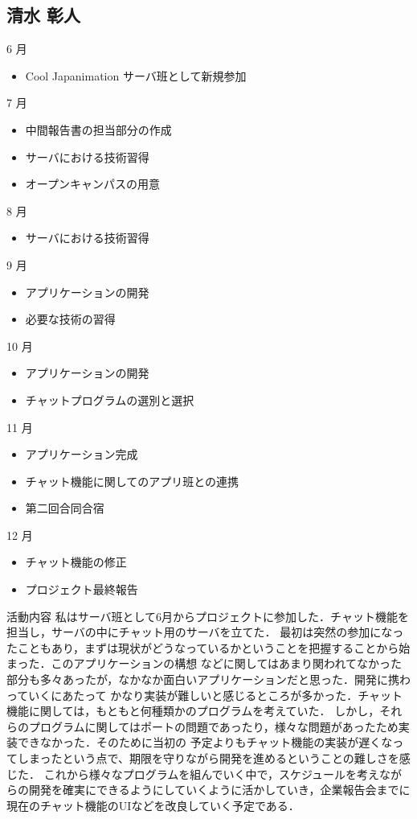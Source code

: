 \subsection{清水 彰人}
6 月
\begin{itemize}
\item Cool Japanimation サーバ班として新規参加
\end{itemize}
7 月
\begin{itemize}
\item 中間報告書の担当部分の作成
\item サーバにおける技術習得
\item オープンキャンパスの用意
\end{itemize}
8 月
\begin{itemize}
\item サーバにおける技術習得
\end{itemize}
9 月
\begin{itemize}
\item アプリケーションの開発
\item 必要な技術の習得
\end{itemize}
10 月
\begin{itemize}
\item アプリケーションの開発
\item チャットプログラムの選別と選択
\end{itemize}
11 月
\begin{itemize}
\item アプリケーション完成
\item チャット機能に関してのアプリ班との連携
\item 第二回合同合宿
\end{itemize}
12 月
\begin{itemize}
\item チャット機能の修正
\item プロジェクト最終報告
\end{itemize}
\par
活動内容
  私はサーバ班として6月からプロジェクトに参加した．チャット機能を担当し，サーバの中にチャット用のサーバを立てた．
  最初は突然の参加になったこともあり，まずは現状がどうなっているかということを把握することから始まった．このアプリケーションの構想
  などに関してはあまり関われてなかった部分も多々あったが，なかなか面白いアプリケーションだと思った．開発に携わっていくにあたって
  かなり実装が難しいと感じるところが多かった．チャット機能に関しては，もともと何種類かのプログラムを考えていた．
  しかし，それらのプログラムに関してはポートの問題であったり，様々な問題があったため実装できなかった．そのために当初の
  予定よりもチャット機能の実装が遅くなってしまったという点で、期限を守りながら開発を進めるということの難しさを感じた．
  これから様々なプログラムを組んでいく中で，スケジュールを考えながらの開発を確実にできるようにしていくように活かしていき，企業報告会までに
  現在のチャット機能のUIなどを改良していく予定である．
  
  
